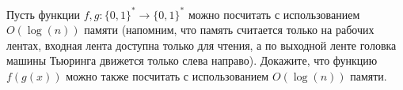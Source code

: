 Пусть функции $f, g: \{0, 1\}^* \rightarrow \{0, 1\}^*$ можно посчитать с использованием $O(\log(n))$ памяти (напомним, что
память считается только на рабочих лентах, входная лента доступна только для чтения, а по выходной ленте головка машины
Тьюринга движется только слева направо). Докажите, что функцию $f(g(x))$ можно также посчитать с использованием $O(\log(n))$
памяти.